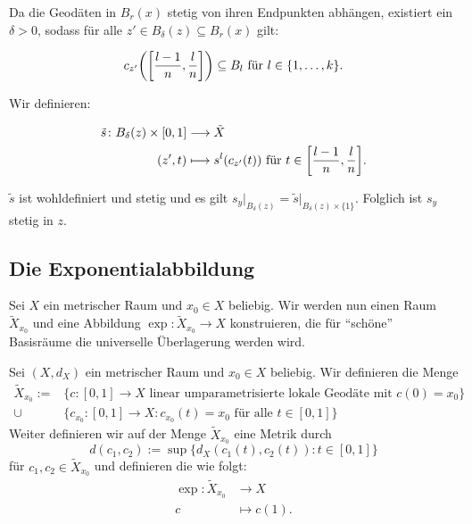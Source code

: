 \begin{beweis}
\begin{itemize}
\begin{figure}[h]
		\end{figure}
		
		Da die Geodäten in $B_r(x)$ stetig von ihren Endpunkten abhängen, existiert ein $\delta > 0$, sodass für alle $z' \in B_\delta(z) \subseteq B_r(x)$ gilt:
		
		\[
			c_{z'} \enbrace*{\benbrace*{\frac{l-1}{n},\frac{l}{n}}} \subseteq B_l \text{ für } l \in \{1,\dots,k\}.
		\]
		
		Wir definieren:

		\begin{align*}
			\tilde{s}\colon B_\delta(z) \times [0,1] &\longrightarrow \tilde{X} \\
			(z',t) &\longmapsto s^l(c_{z'}(t)) \text{ für } t \in \benbrace*{\frac{l-1}{n},\frac{l}{n}}.
		\end{align*}
		
		$\tilde{s}$ ist wohldefiniert und stetig und es gilt $s_y \big|_{B_\delta(z)} = \tilde{s} \big|_{B_\delta(z) \times \{1\}}$.
		Folglich ist $s_y$ stetig in $z$. 	
	\end{itemize}
\end{beweis}

\subsection{Die Exponentialabbildung}
\label{sec:2.3}
	Sei $X$ ein metrischer Raum und $x_0 \in X$ beliebig. 
	Wir werden nun einen Raum $\tilde{X}_{x_0}$ und eine Abbildung $\exp\colon \tilde{X}_{x_0} \rightarrow X$ konstruieren, die für \enquote{schöne} Basisräume die universelle Überlagerung werden wird.
	
\begin{definition}[Exponentialabbildung]
\label{def:2.29}
	Sei $(X,d_X)$ ein metrischer Raum und $x_0 \in X$ beliebig.
	Wir definieren die Menge
	\begin{align*}
		\tilde{X}_{x_0} := &\{c \colon [0,1] \rightarrow X \text{ linear umparametrisierte lokale Geodäte mit } c(0) = x_0\} \\
		\cup &\{c_{x_0} \colon [0,1] \rightarrow X : c_{x_0}(t) = x_0 \text{ für alle } t \in [0,1]\}
	\end{align*}
	Weiter definieren wir auf der Menge $\tilde{X}_{x_0}$ eine Metrik durch
	\[
		d(c_1,c_2) := \sup \{ d_X(c_1(t),c_2(t)) : t \in [0,1]\}
	\]
	für $c_1,c_2 \in \tilde{X}_{x_0}$ und definieren die  wie folgt:
	\begin{align*}
		\exp\colon \tilde{X}_{x_0} &\longrightarrow X \\
		c &\longmapsto c(1).
	\end{align*}
\end{definition}	
	
